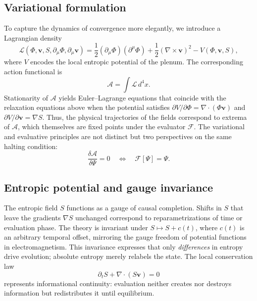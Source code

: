 \documentclass[12pt,a4paper]{article}
\newcommand{\Ph}{\Phi}                %
\newcommand{\Vv}{\mathbf{v}}          %
\newcommand{\Ss}{S}                   %
\newcommand{\lag}{\mathcal{L}}        %
\newcommand{\action}{\mathcal{A}}     %
\newcommand{\divv}{\nabla\!\cdot\!}   %
\newcommand{\grad}{\nabla}            %
\newcommand{\State}{\Psi}             %
\newcommand{\F}{\mathcal{F}}          %
\theoremstyle{plain}
\begin{document}
\subsection{Variational formulation}
To capture the dynamics of convergence more elegantly, we introduce a Lagrangian density
\begin{equation}
\lag(\Ph,\Vv,\Ss,\partial_\mu\Ph,\partial_\mu\Vv)
 = \frac{1}{2}(\partial_\mu \Ph)(\partial^\mu \Ph)
   + \frac{1}{2}(\grad\!\times\!\Vv)^2
   - V(\Ph,\Vv,\Ss),
\end{equation}
where \(V\) encodes the local entropic potential of the plenum.
The corresponding action functional is
\begin{equation}
\label{eq:action}
\action = \int \lag\, d^4x.
\end{equation}
Stationarity of \(\action\) yields Euler–Lagrange equations that coincide with the relaxation equations above when the potential satisfies
\(\partial V/\partial \Ph = \divv(\Ph \Vv)\)
and
\(\partial V/\partial \Vv = \grad \Ss\).
Thus, the physical trajectories of the fields correspond to extrema of \(\action\), which themselves are fixed points under the evaluator \(\F\).
The variational and evaluative principles are not distinct but two perspectives on the same halting condition:
\[
\frac{\delta \action}{\delta \State} = 0
\quad\Longleftrightarrow\quad
\F[\State] = \State.
\]

\subsection{Entropic potential and gauge invariance}
The entropic field \(\Ss\) functions as a gauge of causal completion.
Shifts in \(\Ss\) that leave the gradients \(\grad\Ss\) unchanged correspond to reparametrizations of time or evaluation phase.
The theory is invariant under
\(\Ss \mapsto \Ss + c(t)\),
where \(c(t)\) is an arbitrary temporal offset, mirroring the gauge freedom of potential functions in electromagnetism.
This invariance expresses that only \emph{differences} in entropy drive evolution; absolute entropy merely relabels the state.
The local conservation law
\begin{equation}
\partial_t \Ss + \divv(\Ss \Vv) = 0
\end{equation}
represents informational continuity: evaluation neither creates nor destroys information but redistributes it until equilibrium.
\end{document}
